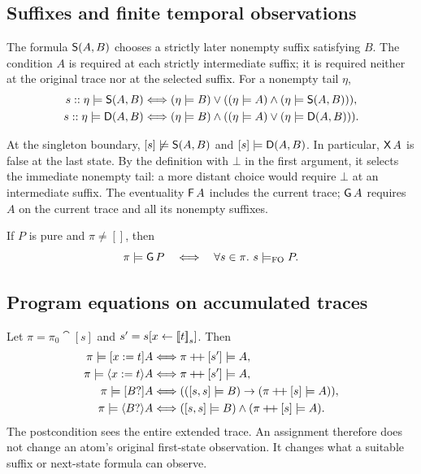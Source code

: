 \subsection{Suffixes and finite temporal observations}
The formula $\mathsf{S}(A,B)$ chooses a strictly later nonempty suffix satisfying
$B$. The condition $A$ is required at each strictly intermediate suffix;
it is required neither at the original trace nor at the selected suffix.
For a nonempty tail $\eta$,
\begin{align}
 s::\eta\models\mathsf{S}(A,B)
 &\Longleftrightarrow
 (\eta\models B)\lor((\eta\models A)\land(\eta\models\mathsf{S}(A,B))),\label{eq:suffix-step}\\
 s::\eta\models\mathsf{D}(A,B)
 &\Longleftrightarrow
 (\eta\models B)\land((\eta\models A)\lor(\eta\models\mathsf{D}(A,B))).\label{eq:dual-step}
\end{align}

At the singleton boundary, $[s]\not\models\mathsf{S}(A,B)$ and
$[s]\models\mathsf{D}(A,B)$. In particular, $\mathsf{X}\,A$ is false at the last
state. By the definition with $\bot$ in the first argument, it selects the
immediate nonempty tail: a more distant choice would require $\bot$ at an
intermediate suffix. The eventuality $\mathsf{F}\,A$ includes the current trace;
$\mathsf{G}\,A$ requires $A$ on the current trace and all its nonempty suffixes.

\begin{theorem}\label{thm:always}
If $P$ is pure and $\pi\ne[]$, then
\[
 \pi\models\mathsf{G}\,P\quad\Longleftrightarrow\quad
 \forall s\in\pi.\ s\models_{\mathrm{FO}}P.
\]
\end{theorem}

\subsection{Program equations on accumulated traces}
Let $\pi=\pi_0\cat[s]$ and $s'=s[x\leftarrow\mathopen{[\![}t\mathclose{]\!]}_{s}]$. Then
\begin{align*}
 \pi\models[x:=t]A&\Longleftrightarrow\pi\mathbin{+\!+}[s']\models A,\\
 \pi\models\langle x:=t\rangle A&\Longleftrightarrow\pi\mathbin{+\!+}[s']\models A,\\
 \pi\models[B?]A&\Longleftrightarrow
   (([s,s]\models B)\to(\pi\mathbin{+\!+}[s]\models A)),\\
 \pi\models\langle B?\rangle A&\Longleftrightarrow
   ([s,s]\models B)\land(\pi\mathbin{+\!+}[s]\models A).
\end{align*}
The postcondition sees the entire extended trace. An assignment therefore
does not change an atom's original first-state observation. It changes what
a suitable suffix or next-state formula can observe.

